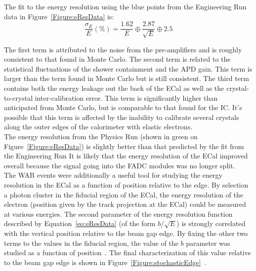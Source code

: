 The fit to the energy resolution using the blue points from the Engineering Run data in Figure~\ref{Figure:eResData} is:\\

\begin{equation}
	\label{eq:eResData}
	\dfrac{\sigma_E}{E}(\%) = \dfrac{1.62}{E}\oplus\dfrac{2.87}{\sqrt{E}}\oplus2.5
\end{equation}

The first term is attributed to the noise from the pre-amplifiers and is roughly consistent to that found in Monte Carlo. The second term is related to the statistical fluctuations of the shower containment and the APD gain. This term is larger than the term found in Monte Carlo but is still consistent. The third term contains both the energy leakage out the back of the ECal as well as the crystal-to-crystal inter-calibration error. This term is significantly higher than anticipated from Monte Carlo, but is comparable to that found for the IC. It's possible that this term is affected by the inability to calibrate several crystals along the outer edges of the calorimeter with elastic electrons. \\
\indent The energy resolution from the Physics Run (shown in green on Figure~\ref{Figure:eResData}) is slightly better than that predicted by the fit from the Engineering Run It is likely that the energy resolution of the ECal improved overall because the signal going into the FADC modules was no longer split. \\
\indent The WAB events were additionally a useful tool for studying the energy resolution in the ECal as a function of position relative to the edge. By selection a photon cluster in the fiducial region of the ECal, the energy resolution of the electron (position given by the track projection at the ECal) could be measured at various energies. The second parameter of the energy resolution function described by Equation~\eqref{eq:eResData} (of the form $b/\sqrt{E}$) is strongly correlated with the vertical position relative to the beam gap edge. By fixing the other two terms to the values in the fiducial region, the value of the $b$ parameter was studied as a function of position~\cite{szumila-vance_hps_2016}. The final characterization of this value relative to the beam gap edge is shown in Figure~\ref{Figure:stochasticEdge}~\cite{balossino_hps_2016}.

